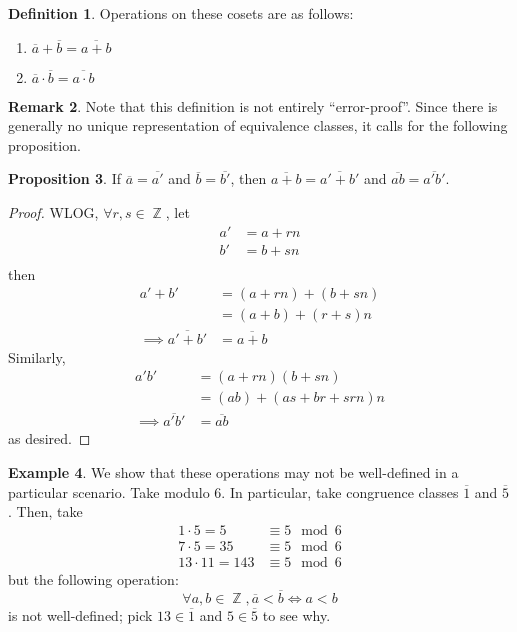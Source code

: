 \documentclass[11pt]{amsart} %
\theoremstyle{definition}
\newtheorem{definition}{Definition}[section]
\newtheorem{proposition}[definition]{Proposition}
\newtheorem{example}[definition]{Example}
\theoremstyle{definition}
\newtheorem{remark}[definition]{Remark}
\DeclareMathOperator{\Z}{\mathbb{Z}}
\numberwithin{equation}{section}
\begin{document}
\begin{definition}
	Operations on these cosets are as follows:
	\begin{enumerate}%
		\item $\overline{a} + \overline{b} = \overline{a+b}$
		\item $  \overline{a} \cdot \overline{b} = \overline{a \cdot b}$
	\end{enumerate}
\end{definition}

\begin{remark}
	Note that this definition is not entirely ``error-proof''. Since there is generally no unique representation of equivalence classes, it calls for the following proposition.
\end{remark}

\begin{proposition}
	If $\overline{a} = \overline{a'}$ and $\overline{b} = \overline{b'}$, then $\overline{a+b} = \overline{a' + b'}$ and $\overline{ab} = \overline{a'b'}$.
\end{proposition}

\begin{proof}
	WLOG, $\forall r,s \in \Z$, let
	\begin{align*}
	a' &= a + rn \\ 
	b' &= b + sn \\ 
	\end{align*}
	then
	\begin{align*}
	a' + b' &= (a+ rn) + (b + sn) \\
	& = (a+b) + (r+s)n \\
	\implies \overline{a' + b'} &= \overline{a+b}
	\end{align*}
	Similarly,
	\begin{align*}
	a' b' &= (a+rn)(b+sn) \\
	&= (ab) + (as + br + srn) n \\
	\implies \overline{a'b'} &= \overline{ab}
	\end{align*}
	as desired.
\end{proof}

\begin{example}
	We show that these operations may not be well-defined in a particular scenario. Take modulo $6$. In particular, take congruence classes $\overline{1}$ and $\overline{5}$. Then, take
	$$ \begin{aligned}
	1 \cdot 5 = 5 &\equiv 5 \mod 6 \\
	7 \cdot 5 = 35 &\equiv 5 \mod 6	\\
	13 \cdot 11 = 143 &\equiv 5 \mod 6	
	\end{aligned} $$
	but the following operation:
	$$\forall a,b \in \Z, \overline{a} < \overline{b} \iff a < b$$
	is not well-defined; pick $13 \in \overline{1} $ and $5 \in \overline{5}$ to see why.
\end{example}
\end{document}
